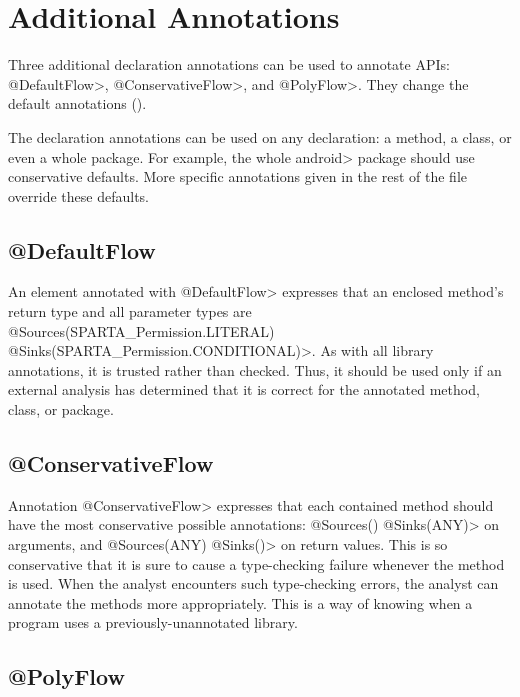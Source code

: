 

\section{Additional Annotations\label{sec:addtionalanno}}

Three additional declaration annotations can be used to annotate APIs:
\<@DefaultFlow>, \<@ConservativeFlow>, and \<@PolyFlow>. 
They change the default annotations ().
 
The declaration annotations can be used on any declaration: a method,
a class, or even a whole package.
For example, the
whole \<android> package should use conservative defaults.
More specific annotations given in the rest of the file override these
defaults.


\subsection{@DefaultFlow}

An element annotated with \<@DefaultFlow> expresses that an enclosed
method's return type and all parameter types are \<@Sources(SPARTA_Permission.LITERAL)
@Sinks(SPARTA_Permission.CONDITIONAL)>.  As with all 
library annotations, it is trusted rather than checked.  Thus, it should be
used only if an external analysis has determined that it is correct for the
annotated method, class, or package.




\subsection{@ConservativeFlow}

Annotation \<@ConservativeFlow> expresses that each contained method
should have the most conservative possible annotations:
  \<@Sources({}) @Sinks(ANY)> on arguments, and
  \<@Sources(ANY) @Sinks({})> on return values.
This is so conservative that it is sure to cause a type-checking failure
whenever the method is used.
When the analyst encounters such type-checking errors, the analyst can
annotate the methods more appropriately.  This is a way of knowing when a
program uses a previously-unannotated library.


\subsection{@PolyFlow\label{sec:polyflow}}

